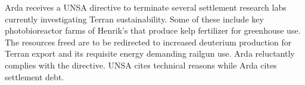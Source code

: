 Arda receives a UNSA directive to terminate several settlement research labs currently investigating Terran sustainability. Some of these include key photobioreactor farms of Henrik's that produce kelp fertilizer for greenhouse use. The resources freed are to be redirected to increased deuterium production for Terran export and its requisite energy demanding railgun use. Arda reluctantly complies with the directive. UNSA cites technical reasons while Arda cites settlement debt.
\StopTimelineDate

